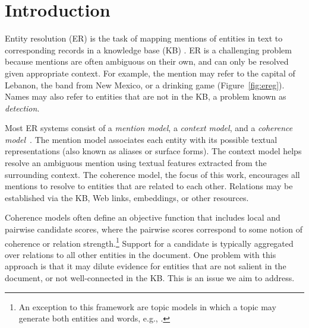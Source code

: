 \section{Introduction}
\label{sec:intro}

Entity resolution (ER) is the task of mapping mentions of entities in
text to corresponding records in a knowledge base (KB)
\cite{BunescuP06,Cucerzan07,KulkarniSRC09,Dredze2010,Hoffart2011,Hachey2013130}.
ER is a challenging problem because mentions are often ambiguous on
their own, and can only be resolved given appropriate context.  For
example, the mention  may refer to the capital of
Lebanon, the band from New Mexico, or a drinking game
(Figure~\ref{fig:ereg}).
Names may also refer to entities that are not in the KB, a problem
 known as \emph{{\NIL} detection}.

Most ER systems consist of a \emph{mention model}, a \emph{context
  model}, and a \emph{coherence
  model}~\cite{Milne2008,Cucerzan07,Ratinov11,Hoffart2011,Hachey2013130}.
The mention model associates each entity with its possible textual
representations (also known as aliases or surface forms).  The context
model helps resolve an ambiguous mention using textual features
extracted from the surrounding context. 
The coherence model, the focus of this work, encourages all mentions to resolve to
entities that are related to each other.  Relations may be established
via the KB, Web links, embeddings, or other resources.

Coherence models often define an objective function that includes
local and pairwise candidate scores, where the pairwise scores
correspond to some notion of coherence or relation
strength.\footnote{An exception to this framework are topic models in
  which a topic may generate both entities and words, e.g.,
  \cite{kataria2011,HanS12,houlsby2014scalable}.} 
  Support for a candidate is typically aggregated over
relations to all other entities in the document. One problem with this approach is that it may
dilute evidence for entities that are not salient in the document, or
not well-connected in the KB. This is an issue we aim to address.

